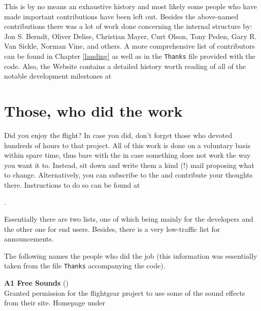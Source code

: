 This is by no means an exhaustive history and most likely some people who have made
important contributions have been left out. Besides the above-named contributions there
was a lot of work done concerning the internal structure by: Jon S. Berndt, Oliver Delise,  Christian Mayer, 
Curt Olson, Tony Peden,  Gary R. Van
Sickle, Norman Vine, and others. A more
comprehensive list of contributors can be found in Chapter \ref{landing} as well as in
the \texttt{Thanks} file provided with the code. Also, the \FlightGear{}
Website contains a detailed history worth reading of all of the
notable development milestones at
 \medskip


\section{Those, who did the work}

Did you enjoy the flight? In case you did, don't forget those who devoted hundreds of
hours to that project. All of this work is done on a voluntary basis within spare time,
thus bare with the  in case something does not work the way you want
it to. Instead, sit down and write them a kind (!) mail proposing what to change.
Alternatively, you can subscribe to the \FlightGear{}  and
contribute your thoughts there. Instructions to do so can be found at
 \medskip

 .
  \medskip

\noindent
 Essentially there are two lists, one of which being mainly for the developers
and the other one for end users. Besides, there is a very low-traffic list for
announcements.
\medskip

 \noindent
The following names the people who did the job (this information was essentially taken
from the file \texttt{Thanks} accompanying the code).
 \medskip

\noindent \textbf{A1 Free Sounds} ()\\
   Granted permission for the flightgear project to use some of the sound effects from their  
   site. Homepage under   
   \medskip
   
